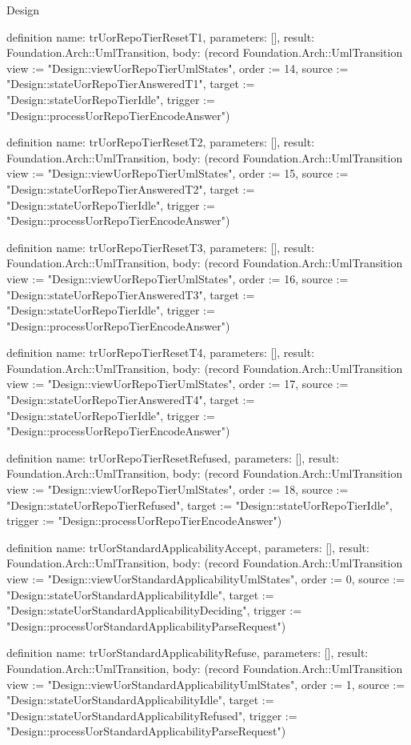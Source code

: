 \begin{lexlean}{Design}
\begin{semanticmodule}
definition{
  name: trUorRepoTierResetT1,
  parameters: [],
  result: Foundation.Arch::UmlTransition,
  body: (record Foundation.Arch::UmlTransition {view := "Design::viewUorRepoTierUmlStates", order := 14, source := "Design::stateUorRepoTierAnsweredT1", target := "Design::stateUorRepoTierIdle", trigger := "Design::processUorRepoTierEncodeAnswer"})
}

definition{
  name: trUorRepoTierResetT2,
  parameters: [],
  result: Foundation.Arch::UmlTransition,
  body: (record Foundation.Arch::UmlTransition {view := "Design::viewUorRepoTierUmlStates", order := 15, source := "Design::stateUorRepoTierAnsweredT2", target := "Design::stateUorRepoTierIdle", trigger := "Design::processUorRepoTierEncodeAnswer"})
}

definition{
  name: trUorRepoTierResetT3,
  parameters: [],
  result: Foundation.Arch::UmlTransition,
  body: (record Foundation.Arch::UmlTransition {view := "Design::viewUorRepoTierUmlStates", order := 16, source := "Design::stateUorRepoTierAnsweredT3", target := "Design::stateUorRepoTierIdle", trigger := "Design::processUorRepoTierEncodeAnswer"})
}

definition{
  name: trUorRepoTierResetT4,
  parameters: [],
  result: Foundation.Arch::UmlTransition,
  body: (record Foundation.Arch::UmlTransition {view := "Design::viewUorRepoTierUmlStates", order := 17, source := "Design::stateUorRepoTierAnsweredT4", target := "Design::stateUorRepoTierIdle", trigger := "Design::processUorRepoTierEncodeAnswer"})
}

definition{
  name: trUorRepoTierResetRefused,
  parameters: [],
  result: Foundation.Arch::UmlTransition,
  body: (record Foundation.Arch::UmlTransition {view := "Design::viewUorRepoTierUmlStates", order := 18, source := "Design::stateUorRepoTierRefused", target := "Design::stateUorRepoTierIdle", trigger := "Design::processUorRepoTierEncodeAnswer"})
}

definition{
  name: trUorStandardApplicabilityAccept,
  parameters: [],
  result: Foundation.Arch::UmlTransition,
  body: (record Foundation.Arch::UmlTransition {view := "Design::viewUorStandardApplicabilityUmlStates", order := 0, source := "Design::stateUorStandardApplicabilityIdle", target := "Design::stateUorStandardApplicabilityDeciding", trigger := "Design::processUorStandardApplicabilityParseRequest"})
}

definition{
  name: trUorStandardApplicabilityRefuse,
  parameters: [],
  result: Foundation.Arch::UmlTransition,
  body: (record Foundation.Arch::UmlTransition {view := "Design::viewUorStandardApplicabilityUmlStates", order := 1, source := "Design::stateUorStandardApplicabilityIdle", target := "Design::stateUorStandardApplicabilityRefused", trigger := "Design::processUorStandardApplicabilityParseRequest"})
}


\end{semanticmodule}
\end{lexlean}
